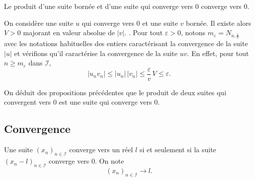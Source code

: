 \begin{propn} \label{convprodborn}
 Le produit d'une suite bornée et d'une suite qui converge vers $0$ converge vers $0$.
\end{propn}
\begin{demo}
  On considère une suite $u$ qui converge vers $0$ et une suite $v$ bornée. Il existe alors $V>0$ majorant en valeur absolue de $|v|$. . Pour tout $\varepsilon >0$, notons $m_\varepsilon = N_{u,\frac{\varepsilon}{V}}$ avec les notations habituelles des entiers caractérisant la convergence de la suite $|u|$ et vérifions qu'il caractérise la convergence de la suite $uv$.\newline
En effet, pour tout $n\geq m_\varepsilon$ dans $\mathcal{I}$,
\begin{displaymath}
|u_n v_n| \leq |u_n|\,|v_n| \leq \frac{\varepsilon}{v}\, V \leq \varepsilon . 
\end{displaymath}
\end{demo}

\begin{rem}
 On déduit des propositions précédentes que le produit de deux suites qui convergent vers 0 est une suite qui converge vers $0$.
\end{rem}

\subsection{Convergence}
\begin{defi}
 Une suite $(x_n)_{n\in \mathcal I}$ converge vers un réel $l$ si et seulement si la suite $(x_n -l )_{n\in \mathcal I}$ converge vers 0. On note 
\begin{displaymath}
 (x_n)_{n\in \mathcal I} \rightarrow l .
\end{displaymath}
\end{defi}

